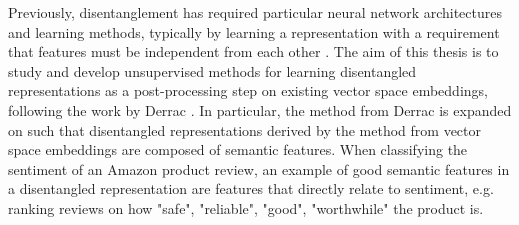 Previously, disentanglement has required particular  neural network architectures and learning methods, typically by learning a representation with a requirement that features must be independent from each other \cite{Banner}  \cite{Paige2016}. The aim of this thesis is to study and develop unsupervised methods for learning disentangled representations as a post-processing step on existing vector space embeddings, following the work by Derrac \cite{Derrac2015}. In particular, the method from Derrac \cite{Derrac2015} is expanded on such that disentangled representations derived by the method from vector space embeddings are composed of semantic features. When classifying the sentiment of an Amazon product review, an example of good semantic features in a  disentangled representation are features that directly relate to sentiment, e.g. ranking reviews on how "safe", "reliable", "good", "worthwhile" the product is. 










